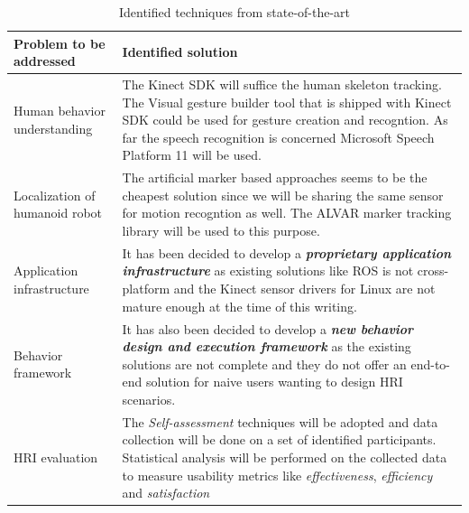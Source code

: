 \begin{table}[H]
\centering
\small
\caption{Identified techniques from state-of-the-art}
\label{table:review_decisions}
\begin{tabular}{ | l | p{10cm} |}
\hline
  \textbf{Problem to be addressed} & \textbf{Identified solution}
  \tabularnewline \hline
  
  Human behavior understanding & The Kinect SDK \cite{KinectSDK2014} will suffice the human skeleton tracking. The Visual gesture builder tool that is shipped with Kinect SDK could be used for gesture creation and recogntion. As far the speech recognition is concerned Microsoft Speech Platform 11 \cite{SpeechSdk} will be used.
                                          \tabularnewline\hline
                                          
  Localization of humanoid robot & The artificial marker based approaches seems to be the cheapest solution since we will be sharing the same sensor for motion recogntion as well. The ALVAR marker tracking library \cite{ALVAR} will be used to this purpose. 
                                          \tabularnewline\hline
  
  Application infrastructure & It has been decided to develop a \textbf{\emph{proprietary application infrastructure}} as existing solutions like ROS \cite{quigley2009ros} is not cross-platform and the Kinect sensor drivers for Linux are not mature enough at the time of this writing.
                                          \tabularnewline\hline

  Behavior framework & It has also been decided to develop a \textbf{\emph{new behavior design and execution framework}} as the existing solutions are not complete and they do not offer an end-to-end solution for naive users wanting to design HRI scenarios.
                                          \tabularnewline\hline

  HRI evaluation & The \emph{Self-assessment} \cite{bethel2010review} techniques will be adopted and data collection will be done on a set of identified participants. Statistical analysis will be performed on the collected data to measure usability metrics like \emph{effectiveness}, \emph{efficiency} and \emph{satisfaction}
                                          \tabularnewline\hline
\end{tabular}
\end{table}